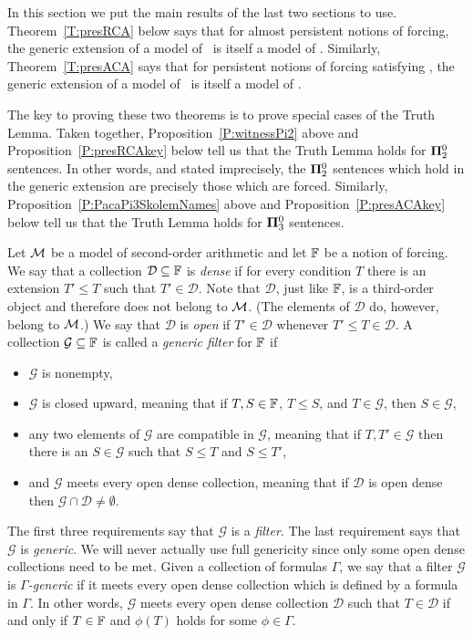 In this section we put the main results of the last two sections to use.
Theorem~\ref{T:presRCA} below says that for almost persistent notions of forcing,
the generic extension of a model of \RCAo\ is itself a model of \RCAo.
Similarly, Theorem~\ref{T:presACA} says that for persistent notions of forcing satisfying \MCP,
the generic extension of a model of \ACAo\ is itself a model of \ACAo.

The key to proving these two theorems is to prove special cases of the Truth Lemma.
Taken together, Proposition~\ref{P:witnessPi2} above and Proposition~\ref{P:presRCAkey} below
tell us that the Truth Lemma holds for $\mathbf{\Pi}^0_2$ sentences.
In other words, and stated imprecisely, the $\mathbf{\Pi}^0_2$ sentences which hold in
the generic extension are precisely those which are forced.
Similarly, Proposition~\ref{P:PacaPi3SkolemNames} above and Proposition~\ref{P:presACAkey} below
tell us that the Truth Lemma holds for $\mathbf{\Pi}^0_3$ sentences.

Let $\mathcal{M}$ be a model of second-order arithmetic and let $\mathbb{F}$ be a notion of forcing.
We say that a collection $\mathcal{D}\subseteq\mathbb{F}$ is \textit{dense} if
for every condition $T$ there is an extension $T'\leq T$ such that $T'\in\mathcal{D}$.
Note that $\mathcal{D}$, just like $\mathbb{F}$, is a third-order object and
therefore does not belong to $\mathcal{M}$.
(The elements of $\mathcal{D}$ do, however, belong to $\mathcal{M}$.)
We say that $\mathcal{D}$ is \textit{open} if $T'\in\mathcal{D}$
whenever $T'\leq T\in\mathcal{D}$.
A collection $\mathcal{G}\subseteq\mathbb{F}$ is called a \textit{generic filter} for $\mathbb{F}$ if
\begin{itemize}
\item $\mathcal{G}$ is nonempty,
\item $\mathcal{G}$ is closed upward, meaning that if
		$T,S\in\mathbb{F}$, $T\leq S$, and $T\in\mathcal{G}$, then $S\in\mathcal{G}$,
\item any two elements of $\mathcal{G}$ are compatible in $\mathcal{G}$, meaning that if $T,T'\in\mathcal{G}$
		then there is an $S\in\mathcal{G}$ such that $S\leq T$ and $S\leq T'$,
\item and $\mathcal{G}$ meets every open dense collection, meaning that if $\mathcal{D}$ is open dense
		then $\mathcal{G}\cap\mathcal{D}\neq\emptyset$.
\end{itemize}
The first three requirements say that $\mathcal{G}$ is a \textit{filter}.
The last requirement says that $\mathcal{G}$ is \textit{generic}.
We will never actually use full genericity since only
some open dense collections need to be met.
Given a collection of formulas $\Gamma$,
we say that a filter $\mathcal{G}$ is \textit{$\Gamma$-generic}
if it meets every open dense collection which is defined by a formula in $\Gamma$.
In other words, $\mathcal{G}$ meets every open dense collection
$\mathcal{D}$ such that $T\in\mathcal{D}$ if and only if $T\in\mathbb{F}$ and $\phi(T)$
holds for some $\phi\in\Gamma$.

